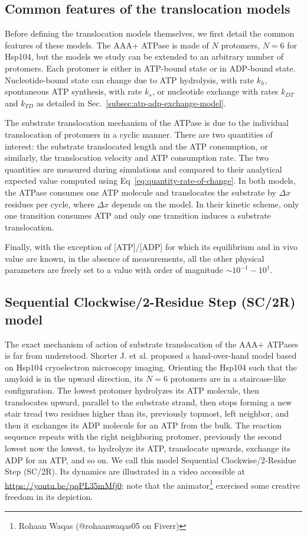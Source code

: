 \subsection{Common features of the translocation models}
    Before defining the translocation models themselves, we first detail the common features of these models. The AAA+ ATPase is made of $N$ protomers, $N=6$ for Hsp104, but the models we study can be extended to an arbitrary number of protomers. Each protomer is either in ATP-bound state or in ADP-bound state. Nucleotide-bound state can change due to ATP hydrolysis, with rate $k_h$, spontaneous ATP synthesis, with rate $k_s$, or nucleotide exchange with rates $k_{DT}$ and $k_{TD}$ as detailed in Sec.~\ref{subsec:atp-adp-exchange-model}.

    The substrate translocation mechanism of the ATPase is due to the individual translocation of protomers in a cyclic manner. There are two quantities of interest: the substrate translocated length and the ATP consumption, or similarly, the translocation velocity and ATP consumption rate. The two quantities are measured during simulations and compared to their analytical expected value computed using Eq~\eqref{eq:quantity-rate-of-change}. In both models, the ATPase consumes one ATP molecule and translocates the substrate by $\Delta x$ residues per cycle, where $\Delta x$ depends on the model. In their kinetic scheme, only one transition consumes ATP and only one transition induces a substrate translocation.

    Finally, with the exception of [ATP]/[ADP] for which its equilibrium and in vivo value are known\cite{meyrat_atp_2019}, in the absence of measurements, all the other physical parameters are freely set to a value with order of magnitude $\sim10^{-1}-10^1$.

\subsection{Sequential Clockwise/2-Residue Step (SC/2R) model}
\label{subsec:sc2r-model}
    The exact mechanism of action of substrate translocation of the AAA+ ATPases is far from understood. Shorter J. et al. proposed a hand-over-hand model based on Hsp104 cryoelectron microscopy imaging\cite{shorter_spiraling_2019}. Orienting the Hsp104 such that the amyloid is in the upward direction, its $N=6$ protomers are in a staircase-like configuration. The lowest protomer hydrolyzes its ATP molecule, then translocates upward, parallel to the substrate strand, then stops forming a new stair tread two residues higher than its, previously topmost, left neighbor, and then it exchanges its ADP molecule for an ATP from the bulk. The reaction sequence repeats with the right neighboring protomer, previously the second lowest now the lowest, to hydrolyze its ATP, translocate upwards, exchange its ADP for an ATP, and so on. We call this model Sequential Clockwise/2-Residue Step (SC/2R). Its dynamics are illustrated in a video accessible at \url{https://youtu.be/pqPL35mMfj0}; note that the animator\footnote{Rohaan Waqas (@rohaanwaqas05 on Fiverr)} exercised some creative freedom in its depiction.

